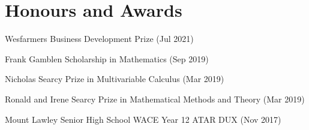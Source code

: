 \documentclass[letterpaper,10.8pt]{article}
\begin{document}
\section{Honours and Awards}
\begin{description}[font=$\bullet$]
\item {Wesfarmers Business Development Prize (Jul 2021)} 
\item {Frank Gamblen Scholarship in Mathematics (Sep 2019)}
\item {Nicholas Searcy Prize in Multivariable Calculus (Mar 2019)}
\item {Ronald and Irene Searcy Prize in Mathematical Methods and Theory (Mar 2019)}
\item {Mount Lawley Senior High School WACE Year 12 ATAR DUX (Nov 2017)}
\end{description}
\end{document}
